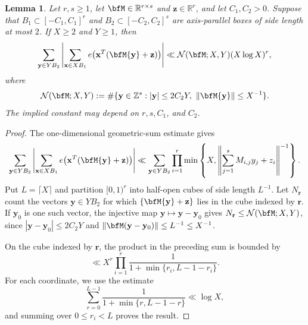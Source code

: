 \documentclass[12pt,reqno]{amsart}
\newtheorem{lemma}[theorem]{Lemma}
\theoremstyle{definition}
\theoremstyle{remark}
\numberwithin{equation}{section}
\def\bfr{{\mathbf r}}
\def\bfx{{\mathbf x}}
\def\bfy{{\mathbf y}}
\def\bfz{{\mathbf z}}
\def\R{{\mathbb R}}\def\T{{\mathbb T}}
\def\Z{{\mathbb Z}}\def\Q{{\mathbb Q}}
\begin{document}
\begin{lemma}\label{lemma:bilinearbound}
    Let $r,s\geq1$, let $\bfM\in\R^{r\times s}$ and
    $\bfz\in\R^r$, and let $C_1,C_2>0$. Suppose that
    $B_1\subset[-C_1,C_1]^r$ and $B_2\subset[-C_2,C_2]^s$ are
    axis-parallel boxes of side length at most $2$. If $X\geq2$ and
    $Y\geq1$, then
    \[
    \sum_{\bfy\in YB_2}\left|\sum_{\bfx\in XB_1}
    e\bigl(\bfx^T(\bfM\bfy+\bfz)\bigr)\right|
    \ll\mathcal N(\bfM;X,Y)(X\log X)^r,
    \]
    where
    \[
    \mathcal N(\bfM;X,Y):=\#\{\bfy\in\Z^s:|\bfy|\leq2C_2Y,
    \ \|\bfM\bfy\|\leq X^{-1}\}.
    \]
    The implied constant may depend on $r,s,C_1$, and $C_2$.
\end{lemma}
\begin{proof}
    The one-dimensional geometric-sum estimate gives
    \begin{align*}
        \sum_{\bfy\in YB_2}\left|\sum_{\bfx\in XB_1}
        e\bigl(\bfx^T(\bfM\bfy+\bfz)\bigr)\right|\ll\sum_{\bfy\in YB_2}\prod_{i=1}^{r}
        \min\left\{X,\left\|\sum_{j=1}^{s}M_{i,j}y_j+z_i
        \right\|^{-1}\right\}.
    \end{align*}
    Put $L=\lceil X\rceil$ and partition $[0,1)^r$ into half-open
    cubes of side length $L^{-1}$. Let $N_{\bfr}$ count the vectors
    $\bfy\in YB_2$ for which $\{\bfM\bfy+\bfz\}$ lies in the cube
    indexed by $\bfr$. If $\bfy_0$ is one such vector, the injective map
    $\bfy\mapsto\bfy-\bfy_0$ gives
    $N_{\bfr}\leq\mathcal N(\bfM;X,Y)$, since
    $|\bfy-\bfy_0|\leq2C_2Y$ and
    $\|\bfM(\bfy-\bfy_0)\|\leq L^{-1}\leq X^{-1}$.

    On the cube indexed by $\bfr$, the product in the preceding sum is
    bounded by
    \[
        \ll X^r\prod_{i=1}^{r}
        \frac{1}{1+\min\{r_i,L-1-r_i\}}.
    \]
For each coordinate, we use the estimate
\[
    \sum_{r=0}^{L-1}\frac{1}{1+\min\{r,L-1-r\}}\ll\log X,
\]
and summing over $0\leq r_i<L$ proves the result.
\end{proof}
\end{document}
